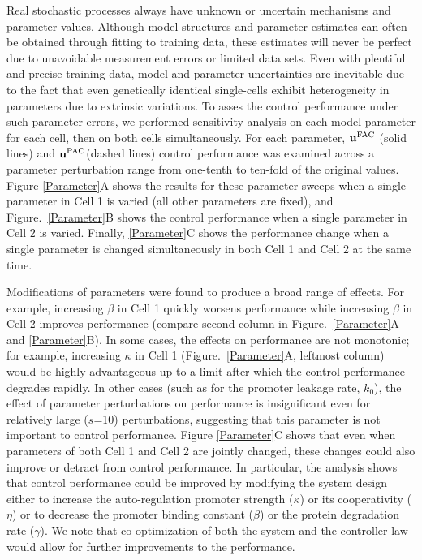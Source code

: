 \documentclass[12pt]{iopart}
\begin{document}
Real stochastic processes always have unknown or uncertain mechanisms and parameter values. Although model structures and parameter estimates can often be obtained through fitting to training data, these estimates will never be perfect due to unavoidable measurement errors or limited data sets. 
Even with plentiful and precise training data, model and parameter uncertainties are inevitable due to the fact that even genetically identical single-cells exhibit heterogeneity in parameters due to extrinsic variations.
To asses the control performance under such parameter errors, we performed sensitivity analysis on each model parameter for each cell, then on both cells simultaneously. 
For each parameter, $\mathbf{u}^{\rm FAC}$ (solid lines) and $\mathbf{u}^{\rm PAC}$(dashed lines) control performance was examined across a parameter perturbation range from one-tenth to ten-fold of the original values.
Figure \ref{Parameter}A shows the results for these parameter sweeps when a single parameter in Cell 1 is varied (all other parameters are fixed), and Figure.\ \ref{Parameter}B shows the control performance when a single parameter in Cell 2 is varied. 
Finally, \ref{Parameter}C shows the performance change when a single parameter is changed simultaneously in both Cell 1 and Cell 2 at the same time.

Modifications of parameters were found to produce a broad range of effects. 
For example, increasing $\beta$ in Cell 1 quickly worsens performance while increasing $\beta$ in Cell 2 improves performance (compare second column in Figure.\ \ref{Parameter}A and \ref{Parameter}B). 
In some cases, the effects on performance are not monotonic; for example, increasing $\kappa$ in Cell 1 (Figure.\ \ref{Parameter}A, leftmost column) would be highly advantageous up to a limit after which the control performance degrades rapidly. 
In other cases (such as for the promoter leakage rate, $k_0$), the effect of parameter perturbations on performance is insignificant even for relatively large ($s$=10) perturbations, suggesting that this parameter is not important to control performance.
Figure \ref{Parameter}C shows that even when parameters of both Cell 1 and Cell 2 are jointly changed, these changes could also improve or detract from control performance. 
In particular, the analysis shows that control performance could be improved by modifying the system design either to increase the auto-regulation promoter strength ($\kappa$) or its cooperativity ($\eta$) or to decrease the promoter binding constant ($\beta$) or the protein degradation rate ($\gamma$). We note that co-optimization of both the system and the controller law would allow for further improvements to the performance.
\end{document}
